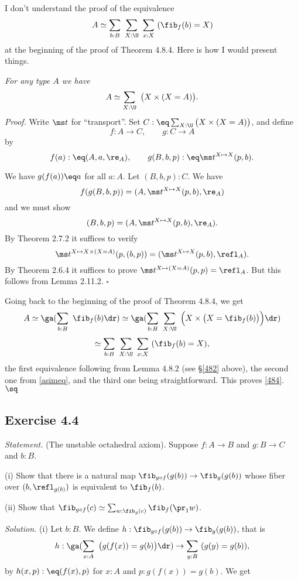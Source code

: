 \documentclass[12pt]{article}
\begin{document}
I don't understand the proof of the equivalence 
\begin{equation}\label{484}
A\simeq\sum_{b:B}\ \sum_{X:\U}\ \sum_{x:X}\ (\fib_f(b)=X)
\end{equation}
at the beginning of the proof of Theorem 4.8.4. Here is how I would present things. 

\nn{} \emph{For any type $A$ we have} 
\begin{equation}\label{asimeq}
A\simeq\sum_{X:\U}\ \big(X\times(X=A)\big).
\end{equation}
\emph{Proof.} Write $\ms t$ for ``transport''. Set $C:\eq\sum_{X:\U}\big(X\times(X=A)\big)$, and define 
$$
f:A\to C,\qquad g:C\to A
$$ 
by 
$$
f(a):\eq(A,a,\re_A),\qquad g(B,b,p):\eq\ms t^{X\mapsto X}(p,b).
$$ 

\nn We have $g(f(a))\eq a$ for all $a:A$. Let $(B,b,p):C$. We have 
$$
f(g(B,b,p))=(A,\ms t^{X\mapsto X}(p,b),\re_A)
$$ 
and we must show 
$$
(B,b,p)=(A,\ms t^{X\mapsto X}(p,b),\re_A).
$$
By Theorem 2.7.2 it suffices to verify 
$$
\ms t^{X\mapsto X\times(X=A)}(p,(b,p))=(\ms t^{X\mapsto X}(p,b),\refl_A).
$$ 
By Theorem 2.6.4 it suffices to prove $\ms t^{X\mapsto(X=A)}(p,p)=\refl_A$. But this follows from Lemma 2.11.2. $\square$

Going back to the beginning of the proof of Theorem 4.8.4, we get 
$$
A\simeq\ga(\sum_{b:B}\ \fib_f(b)\dr)\simeq\ga(\sum_{b:B}\ \sum_{X:\U}\ \Big(X\times\big(X=\fib_f(b)\big)\Big)\dr)
$$
$$
\simeq\sum_{b:B}\ \sum_{X:\U}\ \sum_{x:X}\ (\fib_f(b)=X),
$$ 
the first equivalence following from Lemma 4.8.2 (see \S\ref{482} above), the second one from \eqref{asimeq}, and the third one being straightforward. This proves \eqref{484}. $\sq$


\subsection{Exercise 4.4}

\emph{Statement.} (The unstable octahedral axiom). Suppose $f:A\to B$ and $g:B\to C$ and $b:B$.

\nn(i) Show that there is a natural map $\fib_{g\circ f}(g(b))\to\fib_g(g(b))$ whose fiber over $(b, \refl_{g(b)})$ is equivalent to $\fib_f(b)$.

\nn(ii) Show that $\fib_{g\circ f}(c)\simeq\sum_{w:\fib_g(c)}\fib_f(\pr_1w)$.

\nn\emph{Solution.} (i) Let $b:B$. We define $h:\fib_{g\circ f}(g(b))\to\fib_g(g(b))$, that is
$$
h:\ga(\sum_{x:A}\ \big(g(f(x))=g(b)\big)\dr)\to\sum_{y:B}\ (g(y)=g(b)),
$$ 
by $h(x,p):\eq(f(x),p)$ for $x:A$ and $p:g(f(x))=g(b)$. We get 
\end{document}
